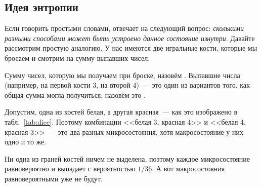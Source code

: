 \subsection*{Идея энтропии}

Если говорить простыми словами,  отвечает на следующий вопрос: \emph{сколькими разными способами может быть устроено данное состояние изнутри}. Давайте рассмотрим простую аналогию. У нас имеются две игральные кости, которые мы бросаем и смотрим на сумму выпавших чисел.

Сумму чисел, которую мы получаем при броске, назовём . Выпавшие числа (например, на первой кости 3, на второй 4)~--- это один из вариантов того, как общая сумма могла получиться; назовём это .

Допустим, одна из костей белая, а другая красная~--- как это изображено в табл.~\ref{tab:dice}. Поэтому комбинации <<белая 3, красная 4>> и <<белая 4, красная 3>>~--- это два разных микросостояния, хотя макросостояние у них одно и то же.

Ни одна из граней костей ничем не выделена, поэтому каждое микросостояние равновероятно и выпадает с вероятностью $1/36$. А вот макросостояния равновероятными уже не будут.

